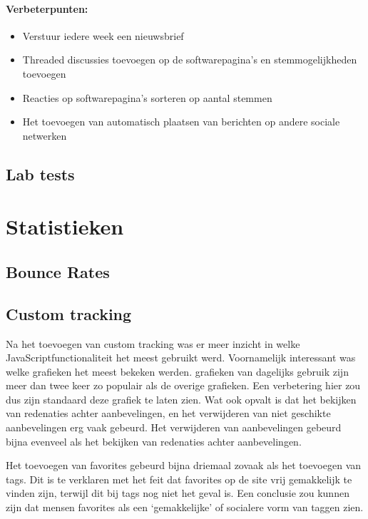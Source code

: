\documentclass[a4paper, 10pt, pdftex]{report}
\begin{document}
      \paragraph{\textbf{Verbeterpunten:}}
      \begin{itemize}
        \item Verstuur iedere week een nieuwsbrief
        \item Threaded discussies toevoegen op de softwarepagina's en stemmogelijkheden toevoegen
        \item Reacties op softwarepagina's sorteren op aantal stemmen
        \item Het toevoegen van automatisch plaatsen van berichten op andere sociale netwerken
      \end{itemize}

      \subsection{Lab tests}


    \section{Statistieken}
    \subsection{Bounce Rates}

    \subsection{Custom tracking}
    Na het toevoegen van custom tracking was er meer inzicht in welke JavaScriptfunctionaliteit het meest gebruikt werd. Voornamelijk interessant was welke grafieken het meest bekeken werden. grafieken van dagelijks gebruik zijn meer dan twee keer zo populair als de overige grafieken. Een verbetering hier zou dus zijn standaard deze grafiek te laten zien. Wat ook opvalt is dat het bekijken van redenaties achter aanbevelingen, en het verwijderen van niet geschikte aanbevelingen erg vaak gebeurd. Het verwijderen van aanbevelingen gebeurd bijna evenveel als het bekijken van redenaties achter aanbevelingen.

    Het toevoegen van favorites gebeurd bijna driemaal zovaak als het toevoegen van tags. Dit is te verklaren met het feit dat favorites op de site vrij gemakkelijk te vinden zijn, terwijl dit bij tags nog niet het geval is. Een conclusie zou kunnen zijn dat mensen favorites als een `gemakkelijke' of socialere vorm van taggen zien.
\end{document}
